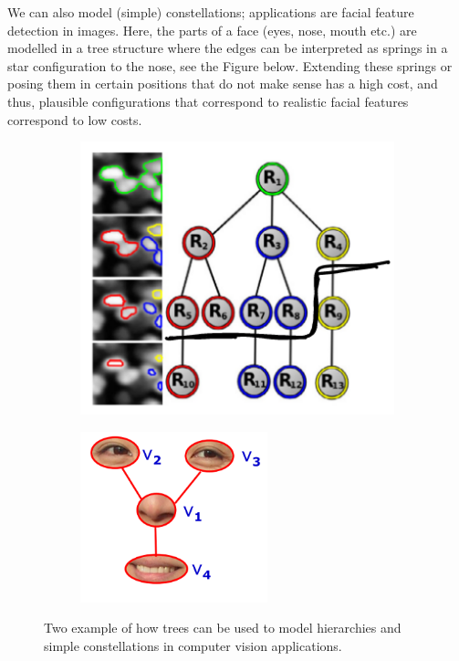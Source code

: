 We can also model (simple) constellations; applications are facial
feature detection in images. Here, the parts of a face (eyes, nose,
mouth etc.) are modelled in a tree structure where the edges can be
interpreted as springs in a star configuration to the nose, see the
Figure below. Extending these springs or posing them in certain
positions that do not make sense has a high cost, and thus, plausible
configurations that correspond to realistic facial features correspond
to low costs.
\begin{figure}[htpb]
  \begin{subfigure}[c]{0.5\textwidth}
    \centering
    \includegraphics[width=0.7\linewidth]{Figures/tree-cells}
  \end{subfigure}%
  \begin{subfigure}[c]{0.5\textwidth}
    \centering
    \includegraphics[width=0.7\linewidth]{Figures/tree-face}
  \end{subfigure}
  \caption{Two example of how trees can be used to model hierarchies
    and simple constellations in computer vision applications.}
\end{figure}

